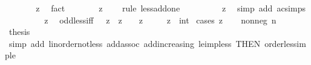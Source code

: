 \begin{isabellebody}
\ {\isacharminus}{\kern0pt}\isanewline
\ \ \isamarkupfalse%
\ {\isachardoublequoteopen}{}\ {\isasymle}\ z{\isachardoublequoteclose}\ \isamarkupfalse%
\ fact\isanewline
\ \ \isamarkupfalse%
\ \isamarkupfalse%
\ {\isachardoublequoteopen}{\isasymdots}\ {\isacharless}{\kern0pt}\ z\ {\isacharplus}{\kern0pt}\ {}{\isachardoublequoteclose}\ \isamarkupfalse%
\ {\isacharparenleft}{\kern0pt}rule\ less{\isacharunderscore}{\kern0pt}add{\isacharunderscore}{\kern0pt}one{\isacharparenright}{\kern0pt}\isanewline
\ \ \isamarkupfalse%
\ \isamarkupfalse%
\ {\isachardoublequoteopen}{\isasymdots}\ {\isacharequal}{\kern0pt}\ {}\ {\isacharplus}{\kern0pt}\ z{\isachardoublequoteclose}\ \isamarkupfalse%
\ {\isacharparenleft}{\kern0pt}simp\ add{\isacharcolon}{\kern0pt}\ ac{\isacharunderscore}{\kern0pt}simps{\isacharparenright}{\kern0pt}\isanewline
\ \ \isamarkupfalse%
\ \isamarkupfalse%
\ {\isachardoublequoteopen}{}\ {\isacharless}{\kern0pt}\ {}\ {\isacharplus}{\kern0pt}\ z{\isachardoublequoteclose}\ \isacommand{{\isachardot}{\kern0pt}}\isamarkupfalse%
\isanewline
{}\isamarkupfalse%
%
\endisatagproof
{\isafoldproof}%
%
\isadelimproof
\isanewline
%
\endisadelimproof
\isanewline
{}\isamarkupfalse%
\ odd{\isacharunderscore}{\kern0pt}less{\isacharunderscore}{\kern0pt}{}{\isacharunderscore}{\kern0pt}iff{\isacharcolon}{\kern0pt}\ {\isachardoublequoteopen}{}\ {\isacharplus}{\kern0pt}\ z\ {\isacharplus}{\kern0pt}\ z\ {\isacharless}{\kern0pt}\ {}\ {\isasymlongleftrightarrow}\ z\ {\isacharless}{\kern0pt}\ {}{\isachardoublequoteclose}\isanewline
\ \ \ z\ {\isacharcolon}{\kern0pt}{\isacharcolon}{\kern0pt}\ int\isanewline
%
\isadelimproof
%
\endisadelimproof
%
\isatagproof
{}\isamarkupfalse%
\ {\isacharparenleft}{\kern0pt}cases\ z{\isacharparenright}{\kern0pt}\isanewline
\ \ \isamarkupfalse%
\ {\isacharparenleft}{\kern0pt}nonneg\ n{\isacharparenright}{\kern0pt}\isanewline
\ \ \isamarkupfalse%
\ \isamarkupfalse%
\ {\isacharquery}{\kern0pt}thesis\isanewline
\ \ \ \ \isamarkupfalse%
\ {\isacharparenleft}{\kern0pt}simp\ add{\isacharcolon}{\kern0pt}\ linorder{\isacharunderscore}{\kern0pt}not{\isacharunderscore}{\kern0pt}less\ add{\isachardot}{\kern0pt}assoc\ add{\isacharunderscore}{\kern0pt}increasing\ le{\isacharunderscore}{\kern0pt}imp{\isacharunderscore}{\kern0pt}{}{\isacharunderscore}{\kern0pt}less\ {\isacharbrackleft}{\kern0pt}THEN\ order{\isacharunderscore}{\kern0pt}less{\isacharunderscore}{\kern0pt}imp{\isacharunderscore}{\kern0pt}le{\isacharbrackright}{\kern0pt}{\isacharparenright}{\kern0pt}\isanewline

\end{isabellebody}
